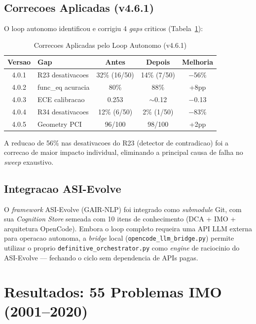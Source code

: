 \documentclass[5p]{elsarticle}
\newcommand{\tabfootnotesize}{\fontsize{9}{11}\selectfont}
\begin{document}
\subsection{Correcoes Aplicadas (v4.6.1)}

O loop autonomo identificou e corrigiu 4 \textit{gaps} criticos (Tabela~\ref{tab:gaps}):

\begin{table}[H]
\centering
\caption{Correcoes Aplicadas pelo Loop Autonomo (v4.6.1)}
\label{tab:gaps}
\tabfootnotesize
\begin{tabular}{c p{3.5cm} c c c}
\toprule
\textbf{Versao} & \textbf{Gap} & \textbf{Antes} & \textbf{Depois} & \textbf{Melhoria}\\
\midrule
4.0.1 & R23 desativacoes & 32\% (16/50) & 14\% (7/50) & $-$56\%\\
4.0.2 & func\_eq acuracia & 80\% & 88\% & +8pp\\
4.0.3 & ECE calibracao & 0.253 & $\sim$0.12 & $-$0.13\\
4.0.4 & R34 desativacoes & 12\% (6/50) & 2\% (1/50) & $-$83\%\\
4.0.5 & Geometry PCI & 96/100 & 98/100 & +2pp\\
\bottomrule
\end{tabular}
\end{table}

A reducao de 56\% nas desativacoes do R23 (detector de contradicao) foi a
correcao de maior impacto individual, eliminando a principal causa de falha no
\textit{sweep} exaustivo.

\subsection{Integracao ASI-Evolve}

O \textit{framework} ASI-Evolve (GAIR-NLP) foi integrado como \textit{submodule}
Git, com sua \textit{Cognition Store} semeada com 10 itens de conhecimento (DCA +
IMO + arquitetura OpenCode). Embora o loop completo requeira uma API LLM externa
para operacao autonoma, a \textit{bridge} local (\texttt{opencode\_llm\_bridge.py})
permite utilizar o proprio \texttt{definitive\_orchestrator.py} como \textit{engine}
de raciocinio do ASI-Evolve --- fechando o ciclo sem dependencia de APIs pagas.

\section{Resultados: 55 Problemas IMO (2001--2020)}
\end{document}
